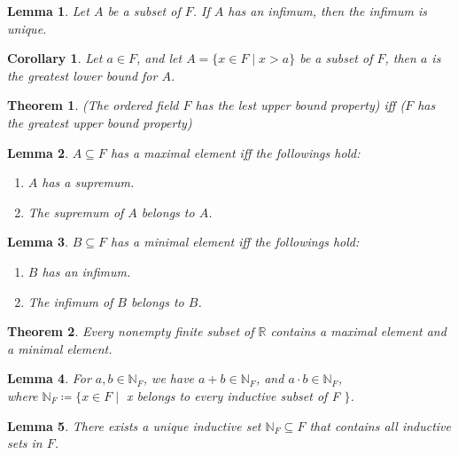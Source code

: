 \documentclass[11pt]{article}
\theoremstyle{break}
\theoremstyle{break}
\newtheorem{thm}{Theorem}[section]
\newtheorem{lem}{Lemma}[thm]
\newtheorem{corL}{Corollary}[lem]
\newcommand{\R}{\mathbb{R}}
\newcommand{\N}{\mathbb{N}}
\begin{document}
	\begin{lem}
		Let $A$ be a subset of $F$. If $A$ has an infimum, then the infimum is unique.
	\end{lem}
	
	\begin{corL}
		Let $a \in F$, and let $A=\{ x \in F \mid x > a \}$ be a subset of $F$, then $a$ is the greatest lower bound for $A$.
	\end{corL}

	\begin{thm}
		(The ordered field $F$ has the lest upper bound property) iff ($F$ has the greatest upper bound property)
	\end{thm} 
	
	\begin{lem}
		$A \subseteq F$ has a maximal element iff the followings hold:
		\begin{enumerate}[topsep=3pt,itemsep=-1ex,partopsep=1ex,parsep=1ex]
		\item $A$ has a supremum.
		\item The supremum of $A$ belongs to $A$.
		\end{enumerate}
	\end{lem}
	
	\begin{lem}
		$B \subseteq F$ has a minimal element iff the followings hold:
		\begin{enumerate}[topsep=3pt,itemsep=-1ex,partopsep=1ex,parsep=1ex]
		\item $B$ has an infimum.
		\item The infimum of $B$ belongs to $B$.
		\end{enumerate}
	\end{lem}
		
	\begin{thm}
		Every nonempty finite subset of $\R$ contains a maximal element and a minimal element.
	\end{thm}		
		
	\begin{lem}
		For $a,b \in \N_F$, we have $a+b \in \N_F$, and $a \cdot b \in \N_F$, \\where $\N_F \coloneqq \{ x \in F \mid$ x belongs to every inductive subset of F $\} $.
	\end{lem}
		
	\begin{lem}
		There exists a unique inductive set $\N_F \subseteq F$ that contains all inductive sets in $F$.
	\end{lem}
	
\end{document}
